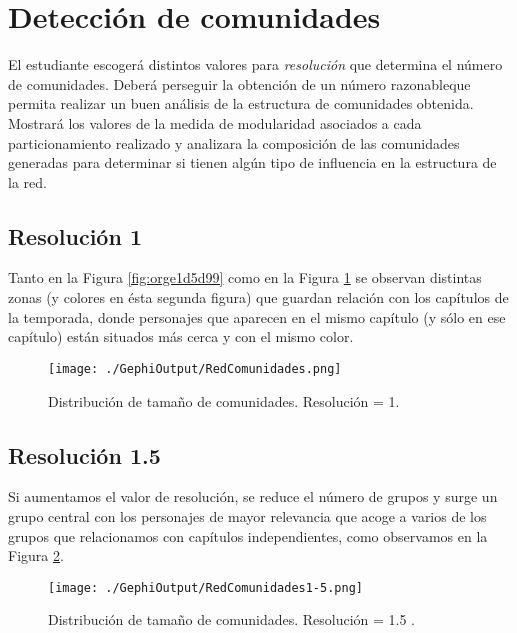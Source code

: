 \documentclass[11pt]{article}
\begin{document}
\section{Detección de comunidades}
\label{sec:orgede750a}

El estudiante escogerá distintos valores para \emph{resolución} que
determina el número de comunidades. Deberá perseguir la obtención de
un número razonableque permita realizar un buen análisis de la
estructura de comunidades obtenida. Mostrará los valores de la medida
de modularidad asociados a cada particionamiento realizado y analizara
la composición de las comunidades generadas para determinar si tienen
algún tipo de influencia en la estructura de la red.



\subsection{Resolución 1}
\label{sec:org47aa166}

Tanto en la Figura \ref{fig:orge1d5d99} como en la Figura \ref{fig:orgd7d5a91} se observan
distintas zonas (y colores en ésta segunda figura) que guardan
relación con los capítulos de la temporada, donde personajes que
aparecen en el mismo capítulo (y sólo en ese capítulo) están situados
más cerca y con el mismo color.

\begin{figure}[htbp]
\centering
\texttt{[image: ./GephiOutput/RedComunidades.png]}
\caption{\label{fig:orgd7d5a91}
Distribución de tamaño de comunidades. Resolución = 1.}
\end{figure}


\subsection{Resolución 1.5}
\label{sec:org3b735b3}

Si aumentamos el valor de resolución, se reduce el número de grupos y
surge un grupo central con los personajes de mayor relevancia que
acoge a varios de los grupos que relacionamos con capítulos
independientes, como observamos en la Figura \ref{fig:org8e51ae5}.


\begin{figure}[htbp]
\centering
\texttt{[image: ./GephiOutput/RedComunidades1-5.png]}
\caption{\label{fig:org8e51ae5}
Distribución de tamaño de comunidades. Resolución = 1.5 .}
\end{figure}
\end{document}
